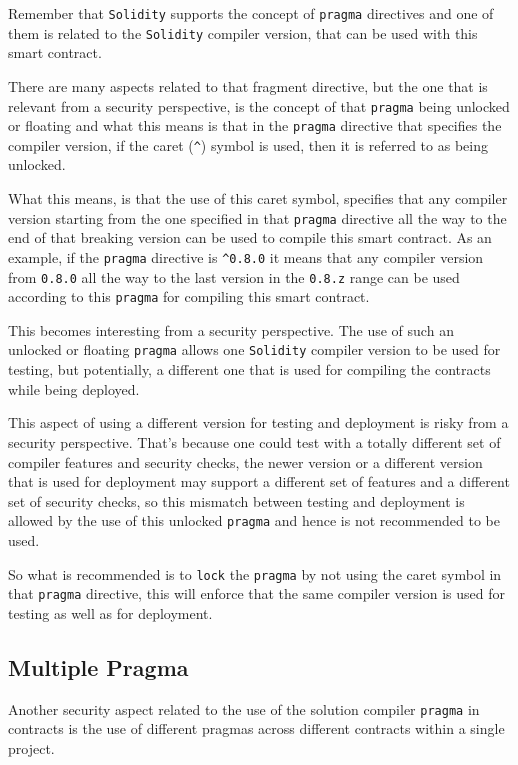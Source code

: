 Remember that \texttt{Solidity} supports the concept of \texttt{pragma}
directives and one of them is related to the \texttt{Solidity} compiler
version, that can be used with this smart contract.

There are many aspects related to that fragment directive, but the one
that is relevant from a security perspective, is the concept of that
\texttt{pragma} being unlocked or floating and what this means is that
in the \texttt{pragma} directive that specifies the compiler version, if
the caret (\texttt{\^{}}) symbol is used, then it is referred to as
being unlocked.

What this means, is that the use of this caret symbol, specifies that
any compiler version starting from the one specified in that
\texttt{pragma} directive all the way to the end of that breaking
version can be used to compile this smart contract. As an example, if
the \texttt{pragma} directive is \texttt{\^{}0.8.0} it means that any
compiler version from \texttt{0.8.0} all the way to the last version in
the \texttt{0.8.z} range can be used according to this \texttt{pragma}
for compiling this smart contract.

This becomes interesting from a security perspective. The use of such an
unlocked or floating \texttt{pragma} allows one \texttt{Solidity}
compiler version to be used for testing, but potentially, a different
one that is used for compiling the contracts while being deployed.

This aspect of using a different version for testing and deployment is
risky from a security perspective. That's because one could test with a
totally different set of compiler features and security checks, the
newer version or a different version that is used for deployment may
support a different set of features and a different set of security
checks, so this mismatch between testing and deployment is allowed by
the use of this unlocked \texttt{pragma} and hence is not recommended to
be used.

So what is recommended is to \texttt{lock} the \texttt{pragma} by not
using the caret symbol in that \texttt{pragma} directive, this will
enforce that the same compiler version is used for testing as well as
for deployment.

\subsection{Multiple Pragma}\label{multiple-pragma}

Another security aspect related to the use of the solution compiler
\texttt{pragma} in contracts is the use of different pragmas across
different contracts within a single project.

